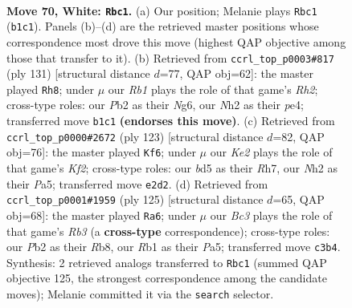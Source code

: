 \documentclass[11pt]{article}
\begin{document}
\clearpage

\begin{figure}[p]\centering
\begin{subfigure}{0.46\textwidth}\centering
\resizebox{\linewidth}{!}{%
\newchessgame
\chessboard[
  setfen={6k1/6p1/p2b2rr/Pppb1p1p/2p2P1P/2B1P1P1/1P2K2N/1R4R1 w - - 12 70},
  showmover=false,
  pgfstyle=straightmove, color=movearrow, markmove={b1-c1}
]}
\caption{}
\end{subfigure}\hfill
\begin{subfigure}{0.46\textwidth}\centering
\resizebox{\linewidth}{!}{%
\newchessgame
\chessboard[
  setfen={8/1k1b3r/1p1p2n1/p1p4r/P1P1Pp1p/1P3P2/4K1PR/4BB1R b - - 19 66},
  showmover=false,
  pgfstyle=straightmove, color=movearrow, markmove={h7-h8}
]}
\caption{}
\end{subfigure}
\\[4pt]
\begin{subfigure}{0.46\textwidth}\centering
\resizebox{\linewidth}{!}{%
\newchessgame
\chessboard[
  setfen={4r3/2pbpk1r/1p1p4/pP1P1Pp1/2P1R1P1/P5K1/8/4RB2 b - - 10 62},
  showmover=false,
  pgfstyle=straightmove, color=movearrow, markmove={f7-f6}
]}
\caption{}
\end{subfigure}\hfill
\begin{subfigure}{0.46\textwidth}\centering
\resizebox{\linewidth}{!}{%
\newchessgame
\chessboard[
  setfen={1r6/4kp2/1r1p1p2/p1p1pPb1/P1P1P2p/1PRR3P/5BP1/4K3 b - - 63 63},
  showmover=false,
  pgfstyle=straightmove, color=movearrow, markmove={b6-a6}
]}
\caption{}
\end{subfigure}
\caption{\textbf{Move 70, White: \texttt{Rbc1}.} (a) Our position; Melanie plays \texttt{Rbc1} (\texttt{b1c1}). Panels (b)--(d) are the retrieved master positions whose correspondence most drove this move (highest QAP objective among those that transfer to it). (b) Retrieved from \texttt{ccrl\_top\_p0003\#817} (ply 131) [structural distance $d$=77, QAP obj=62]: the master played \texttt{Rh8}; under $\mu$ our \emph{Rb1} plays the role of that game's \emph{Rh2}; cross-type roles: our \emph{P}b2 as their \emph{N}g6, our \emph{N}h2 as their \emph{p}e4; transferred move \texttt{b1c1} \textbf{(endorses this move)}. (c) Retrieved from \texttt{ccrl\_top\_p0000\#2672} (ply 123) [structural distance $d$=82, QAP obj=76]: the master played \texttt{Kf6}; under $\mu$ our \emph{Ke2} plays the role of that game's \emph{Kf2}; cross-type roles: our \emph{b}d5 as their \emph{R}h7, our \emph{N}h2 as their \emph{P}a5; transferred move \texttt{e2d2}. (d) Retrieved from \texttt{ccrl\_top\_p0001\#1959} (ply 125) [structural distance $d$=65, QAP obj=68]: the master played \texttt{Ra6}; under $\mu$ our \emph{Bc3} plays the role of that game's \emph{Rb3} (a \textbf{cross-type} correspondence); cross-type roles: our \emph{P}b2 as their \emph{R}b8, our \emph{R}b1 as their \emph{P}a5; transferred move \texttt{c3b4}. Synthesis: 2 retrieved analogs transferred to \texttt{Rbc1} (summed QAP objective 125, the strongest correspondence among the candidate moves); Melanie committed it via the \texttt{search} selector.}
\label{fig:thought-m138}
\end{figure}
\end{document}
